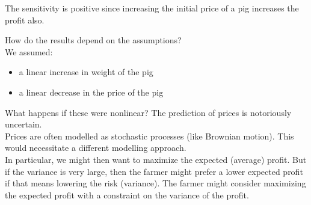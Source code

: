 \documentclass{workbook}
\begin{document}
\begin{solution}
\begin{slide}
\begin{parts}
	\item The sensitivity is positive since increasing the initial price of a pig increases the profit also.
	
\end{parts}


	
\end{slide}

\end{solution}



\begin{slide}

\begin{definition}[Robustness]
How do the results depend on the assumptions?\\

We assumed:
\begin{itemize}
	\item a linear increase in weight of the pig
	\item a linear decrease in the price of the pig	  \\
\end{itemize}

What happens if these were nonlinear? The prediction of prices is notoriously uncertain. \\

Prices are often modelled as stochastic processes (like Brownian motion). This would necessitate a different modelling approach.  \\

In particular, we might then want to maximize the expected (average) profit. But if the variance is very large, then the farmer might prefer a lower expected profit if that means lowering the risk (variance). 
The farmer might consider maximizing the expected profit with a constraint on the variance of the profit.
\end{definition}

\end{slide}
\end{document}
